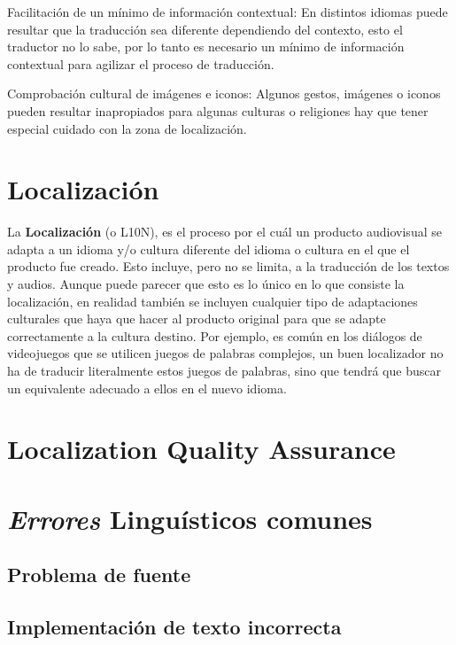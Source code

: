 Facilitación de un mínimo de información contextual: En distintos idiomas puede resultar que la traducción sea diferente dependiendo del contexto, esto el traductor no lo sabe, por lo tanto es necesario un mínimo de información contextual para agilizar el proceso de traducción.

Comprobación cultural de imágenes e iconos: Algunos gestos, imágenes o iconos pueden resultar inapropiados para algunas culturas o religiones hay que tener especial cuidado con la zona de localización.

\section{Localización}

La \textbf{Localización} (o L10N), es el proceso por el cuál un producto audiovisual se adapta a un idioma y/o cultura diferente del idioma o cultura en el que el producto fue creado. Esto incluye, pero no se limita, a la traducción de los textos y audios. Aunque puede parecer que esto es lo único en lo que consiste la localización, en realidad también se incluyen cualquier tipo de adaptaciones culturales que haya que hacer al producto original para que se adapte correctamente a la cultura destino. Por ejemplo, es común en los diálogos de videojuegos que se utilicen juegos de palabras complejos, un buen localizador no ha de traducir literalmente estos juegos de palabras, sino que tendrá que buscar un equivalente adecuado a ellos en el nuevo idioma.


\section{Localization Quality Assurance}


\section{\textit{Errores} Linguísticos comunes} \label{bugs}

\subsection{Problema de fuente} \label{ErrorFuente}



	
\subsection{Implementación de texto incorrecta}\label{ErrorImpIncorrecta}

